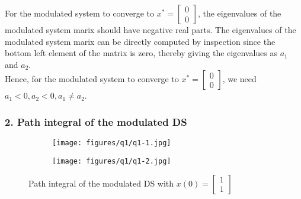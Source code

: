 For the modulated system to converge to \( x^{*}=\begin{bmatrix} 0 \\ 0 \end{bmatrix} \), the eigenvalues of the modulated system marix should have negative real parts.
The eigenvalues of the modulated system marix can be directly computed by inspection since the bottom left element of the matrix is zero, thereby giving the eigenvalues as \( a_1 \) and \( a_2 \).
\\
Hence, for the modulated system to converge to \( x^{*}=\begin{bmatrix} 0 \\ 0 \end{bmatrix} \), we need \( \boxed{a_1 < 0, a_2 < 0, a_1 \neq a_2} \).

\subsubsection*{2. Path integral of the modulated DS}

\begin{figure}[h]
  \centering
  \begin{subfigure}{\textwidth}
    \centering
    \texttt{[image: figures/q1/q1-1.jpg]}
  \end{subfigure}
  \vfill
  \begin{subfigure}{\textwidth}
    \centering
    \texttt{[image: figures/q1/q1-2.jpg]}
  \end{subfigure}
  \caption{Path integral of the modulated DS with \( x(0)=\begin{bmatrix} 1 \\ 1 \end{bmatrix} \)}
\end{figure}
